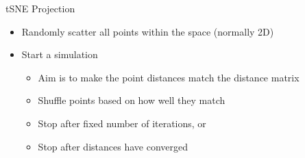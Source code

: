\begin{frame}[allowframebreaks]{tSNE Projection}
    \begin{itemize}
        \item Randomly scatter all points within the space (normally 2D)
        \item Start a simulation
        \begin{itemize}
            \item Aim is to make the point distances match the distance matrix
            \item Shuffle points based on how well they match
            \item Stop after fixed number of iterations, or
            \item Stop after distances have converged
        \end{itemize}
    \end{itemize}

    \framebreak


\end{frame}
